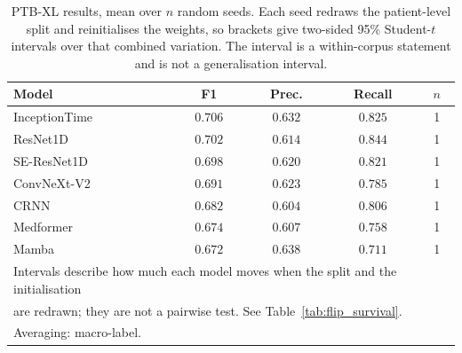 \begin{table}[ht]
\centering
\caption{PTB-XL results, mean over $n$ random seeds. Each seed redraws the patient-level split and reinitialises the weights, so brackets give two-sided 95\% Student-$t$ intervals over that combined variation. The interval is a within-corpus statement and is not a generalisation interval.}
\label{tab:seed_ptbxl}
\small
\begin{tabular}{lcccc}
\toprule
Model & F1 & Prec. & Recall & $n$ \\
\midrule
InceptionTime & $0.706$ & $0.632$ & $0.825$ & 1 \\
ResNet1D & $0.702$ & $0.614$ & $0.844$ & 1 \\
SE-ResNet1D & $0.698$ & $0.620$ & $0.821$ & 1 \\
ConvNeXt-V2 & $0.691$ & $0.623$ & $0.785$ & 1 \\
CRNN & $0.682$ & $0.604$ & $0.806$ & 1 \\
Medformer & $0.674$ & $0.607$ & $0.758$ & 1 \\
Mamba & $0.672$ & $0.638$ & $0.711$ & 1 \\
\midrule
\multicolumn{5}{l}{\footnotesize Intervals describe how much each model moves when the split and the initialisation} \\
\multicolumn{5}{l}{\footnotesize are redrawn; they are not a pairwise test. See Table~\ref{tab:flip_survival}.} \\
\multicolumn{5}{l}{\footnotesize Averaging: macro-label.} \\
\bottomrule
\end{tabular}
\end{table}

